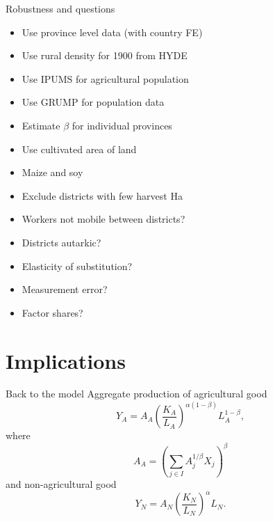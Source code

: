 \documentclass[10pt, xcolor=dvipsnames]{beamer}
\begin{document}
\begin{frame}{Robustness and questions}\label{robustness}
\begin{itemize}
  \item Use province level data (with country FE) \hyperlink{regprov}{}
  \item Use rural density for 1900 from HYDE \hyperlink{reg1900}{}
  \item Use IPUMS for agricultural population \hyperlink{ipums}{}
  \item Use GRUMP for population data \hyperlink{grump}{}
  \item Estimate $\beta$ for individual provinces \hyperlink{prov}{}
  \item Use cultivated area of land \hyperlink{cultreg}{}
  \item Maize and soy \hyperlink{othercrop}{}
  \item Exclude districts with few harvest Ha \hyperlink{harvarea}{}
  \item Workers not mobile between districts? \hyperlink{nonmobile}{}
  \item Districts autarkic? \hyperlink{autarky}{}  
  \item Elasticity of substitution? \hyperlink{eos}{}
  \item Measurement error? \hyperlink{measure}{}
  \item Factor shares? \hyperlink{shares}{}
\end{itemize}
\end{frame}

\section{Implications}

\begin{frame}{Back to the model}\label{extend}
Aggregate production of agricultural good
\begin{equation}
    Y_A = A_A \left(\frac{K_A}{L_A}\right)^{\alpha(1-\beta)} L_A^{1-\beta}, \label{EQ_caL_solve}
\end{equation}
where 
\begin{equation}
    A_A = \left(\sum_{j\in I} A_{j}^{1/\beta}X_{j} \right)^\beta \nonumber
\end{equation}
and non-agricultural good
\begin{equation}
    Y_N = A_N \left(\frac{K_N}{L_N}\right)^{\alpha} L_N. \label{EQ_YN}
\end{equation}
\end{frame}
\end{document}
